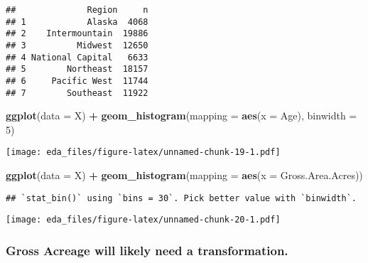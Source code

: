 \documentclass[
]{article}
\newenvironment{Shaded}{\begin{snugshade}}{\end{snugshade}}
\newcommand{\DataTypeTok}[1]{\textcolor[rgb]{0.13,0.29,0.53}{#1}}
\newcommand{\DecValTok}[1]{\textcolor[rgb]{0.00,0.00,0.81}{#1}}
\newcommand{\KeywordTok}[1]{\textcolor[rgb]{0.13,0.29,0.53}{\textbf{#1}}}
\newcommand{\NormalTok}[1]{#1}
\newcommand{\OperatorTok}[1]{\textcolor[rgb]{0.81,0.36,0.00}{\textbf{#1}}}
\newcommand{\StringTok}[1]{\textcolor[rgb]{0.31,0.60,0.02}{#1}}
\begin{document}
\begin{verbatim}
##              Region     n
## 1            Alaska  4068
## 2    Intermountain  19886
## 3          Midwest  12650
## 4 National Capital   6633
## 5        Northeast  18157
## 6     Pacific West  11744
## 7        Southeast  11922
\end{verbatim}

\begin{Shaded}
\begin{Highlighting}[]
\KeywordTok{ggplot}\NormalTok{(}\DataTypeTok{data =}\NormalTok{ X) }\OperatorTok{+}
\StringTok{  }\KeywordTok{geom_histogram}\NormalTok{(}\DataTypeTok{mapping =} \KeywordTok{aes}\NormalTok{(}\DataTypeTok{x =}\NormalTok{ Age), }\DataTypeTok{binwidth =} \DecValTok{5}\NormalTok{)}
\end{Highlighting}
\end{Shaded}

\texttt{[image: eda\_files/figure-latex/unnamed-chunk-19-1.pdf]}

\begin{Shaded}
\begin{Highlighting}[]
\KeywordTok{ggplot}\NormalTok{(}\DataTypeTok{data =}\NormalTok{ X) }\OperatorTok{+}
\StringTok{  }\KeywordTok{geom_histogram}\NormalTok{(}\DataTypeTok{mapping =} \KeywordTok{aes}\NormalTok{(}\DataTypeTok{x =}\NormalTok{ Gross.Area.Acres))}
\end{Highlighting}
\end{Shaded}

\begin{verbatim}
## `stat_bin()` using `bins = 30`. Pick better value with `binwidth`.
\end{verbatim}

\texttt{[image: eda\_files/figure-latex/unnamed-chunk-20-1.pdf]}

\hypertarget{gross-acreage-will-likely-need-a-transformation.}{%
\subsubsection{Gross Acreage will likely need a
transformation.}\label{gross-acreage-will-likely-need-a-transformation.}}

\begin{Shaded}
\end{Shaded}
\end{document}
